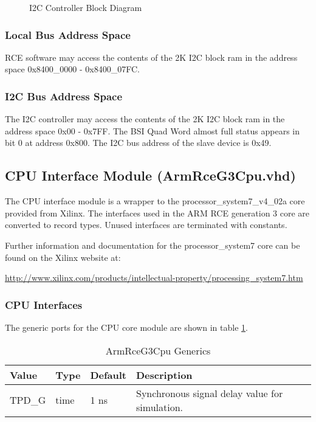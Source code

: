 \documentclass[11pt]{article}
\begin{document}
\begin{figure}[H]
   \centering
   \caption{I2C Controller Block Diagram}
   \label{fig:i2c_cntrl_block}
\end{figure}

\subsubsection{Local Bus Address Space}

RCE software may access the contents of the 2K I2C block ram in the address space 0x8400\_0000 - 0x8400\_07FC.

\subsubsection{I2C Bus Address Space}

The I2C controller may access the contents of the 2K I2C block ram in the address space 0x00 - 0x7FF. 
The BSI Quad Word almost full status appears in bit 0 at address 0x800.
The I2C bus address of the slave device is 0x49.

\subsection{CPU Interface Module (ArmRceG3Cpu.vhd)}
\label{subsec:ArmRceG3Cpu}

The CPU interface module is a wrapper to the processor\_system7\_v4\_02a core provided from Xilinx. 
The interfaces used in the ARM RCE generation 3 core are converted to record types. Unused interfaces are terminated with constants.

Further information and documentation for the processor\_system7 core can be found on the Xilinx website at:
\begin{center}
   \url{http://www.xilinx.com/products/intellectual-property/processing_system7.htm}
\end{center}

\subsubsection{CPU Interfaces}

The generic ports for the CPU core module are shown in table \ref{tab:cpu_core_generics}.

\begin{table}[H]
\small
\centering
   \begin{tabular}{| l | l | l | l | }
      \hline \textbf{Value} & \textbf{Type} & \textbf{Default} & \textbf{Description} \\
      \hline TPD\_G          & time     & 1 ns & Synchronous signal delay value for simulation.    \\
      \hline
   \end{tabular}
   \caption{ArmRceG3Cpu Generics}
   \label{tab:cpu_core_generics}
\end{table}
\end{document}

